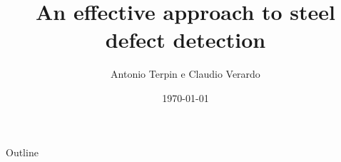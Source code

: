 \documentclass[usenames,dvipsnames,xcolor=table]{beamer}
\title[Steel defect detection]{An effective approach to steel defect detection}
\date[\today]{\today}
\author[Antonio Terpin e Claudio Verardo]{
  Antonio Terpin e Claudio Verardo
}
\institute{Scuola Superiore, University of Udine}
\begin{document}
\begin{frame}
\titlepage
\end{frame}

\begin{frame}{Outline}
\tableofcontents
\end{frame}








\end{document}
